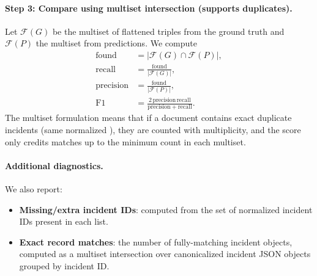 \paragraph{Step 3: Compare using multiset intersection (supports duplicates).}
Let $\mathcal{F}(G)$ be the multiset of flattened triples from the ground truth and $\mathcal{F}(P)$ the multiset from predictions. We compute
\begin{align}
\mathrm{found} &= |\mathcal{F}(G) \cap \mathcal{F}(P)|,\\
\mathrm{recall} &= \frac{\mathrm{found}}{|\mathcal{F}(G)|},\\
\mathrm{precision} &= \frac{\mathrm{found}}{|\mathcal{F}(P)|},\\
\mathrm{F1} &= \frac{2\,\mathrm{precision}\,\mathrm{recall}}{\mathrm{precision}+\mathrm{recall}}.
\end{align}
The multiset formulation means that if a document contains exact duplicate incidents (same normalized ), they are counted with multiplicity, and the score only credits matches up to the minimum count in each multiset.

\paragraph{Additional diagnostics.}
We also report:
\begin{itemize}
    \item \textbf{Missing/extra incident IDs}: computed from the set of normalized incident IDs present in each list.
    \item \textbf{Exact record matches}: the number of fully-matching incident objects, computed as a multiset intersection over canonicalized incident JSON objects grouped by incident ID.
\end{itemize}
